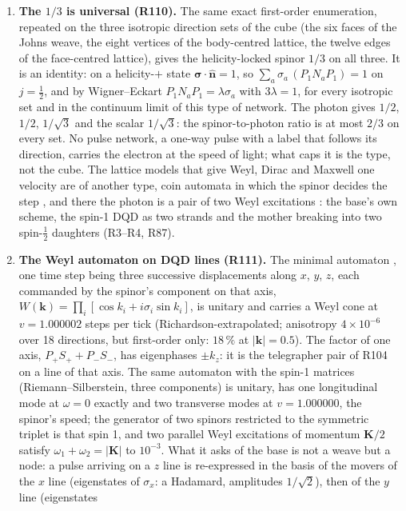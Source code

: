 \documentclass[11pt,a4paper]{article}
\theoremstyle{plain}
\theoremstyle{remark}
\begin{document}
\begin{enumerate}
\item \textbf{The $1/3$ is universal (R110).} The same exact first-order enumeration, repeated on
the three isotropic direction sets of the cube (the six faces of the Johns weave, the eight
vertices of the body-centred lattice, the twelve edges of the face-centred lattice), gives the
helicity-locked spinor $1/3$ on all three. It is an identity: on a helicity-$+$ state
$\boldsymbol\sigma\cdot\hat{\mathbf n} = 1$, so $\sum_a \sigma_a\,(P_1 N_a P_1) = 1$ on
$j = \tfrac12$, and by Wigner--Eckart $P_1 N_a P_1 = \lambda\sigma_a$ with $3\lambda = 1$, for
every isotropic set and in the continuum limit of this type of network. The photon gives $1/2$,
$1/2$, $1/\sqrt3$ and the scalar $1/\sqrt3$: the spinor-to-photon ratio is at most $2/3$ on every
set. No pulse network, a one-way pulse with a label that follows its direction, carries the
electron at the speed of light; what caps it is the type, not the cube. The lattice models that
give Weyl, Dirac and Maxwell one velocity are of another type, coin automata in which the spinor
decides the step \cite{bialynicki,dariano}, and there the photon is a pair of two Weyl
excitations \cite{debroglie}: the base's own scheme, the spin-1 DQD as two strands and the
mother breaking into two spin-$\tfrac12$ daughters (R3--R4, R87).
\item \textbf{The Weyl automaton on DQD lines (R111).} The minimal automaton
\cite{bialynicki}, one time step being three successive displacements along $x$, $y$, $z$, each
commanded by the spinor's component on that axis,
$W(\mathbf k) = \prod_i[\cos k_i + i\sigma_i\sin k_i]$, is unitary and carries a Weyl cone at
$v = 1.000002$ steps per tick (Richardson-extrapolated; anisotropy $4\times10^{-6}$ over 18
directions, but first-order only: $18\,\%$ at $|\mathbf k| = 0.5$). The factor of one axis,
$P_+S_+ + P_-S_-$, has eigenphases $\pm k_z$: it is the telegrapher pair of R104 on a line of that
axis. The same automaton with the spin-1 matrices (Riemann--Silberstein, three components) is
unitary, has one longitudinal mode at $\omega = 0$ exactly and two transverse modes at
$v = 1.000000$, the spinor's speed; the generator of two spinors restricted to the symmetric
triplet is that spin 1, and two parallel Weyl excitations of momentum $\mathbf K/2$ satisfy
$\omega_1 + \omega_2 = |\mathbf K|$ to $10^{-3}$. What it asks of the base is not a weave but a
node: a pulse arriving on a $z$ line is re-expressed in the basis of the movers of the $x$ line
(eigenstates of $\sigma_x$: a Hadamard, amplitudes $1/\sqrt2$), then of the $y$ line (eigenstates

\end{enumerate}
\end{document}
